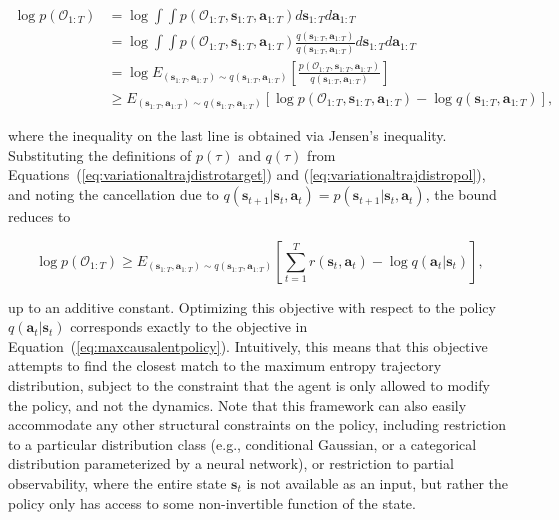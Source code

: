 \begin{align*}
\log p(\mathcal{O}_{1:T}) &= \log \int \int p(\mathcal{O}_{1:T}, \mathbf{s}_{1:T}, \mathbf{a}_{1:T}) d\mathbf{s}_{1:T} d\mathbf{a}_{1:T} \\
&= \log \int \int p(\mathcal{O}_{1:T}, \mathbf{s}_{1:T}, \mathbf{a}_{1:T}) \frac{q(\mathbf{s}_{1:T}, \mathbf{a}_{1:T})}{q(\mathbf{s}_{1:T}, \mathbf{a}_{1:T})} d\mathbf{s}_{1:T} d\mathbf{a}_{1:T} \\
&= \log E_{(\mathbf{s}_{1:T},\mathbf{a}_{1:T})\sim q(\mathbf{s}_{1:T}, \mathbf{a}_{1:T})} \left[ \frac{p(\mathcal{O}_{1:T}, \mathbf{s}_{1:T}, \mathbf{a}_{1:T})}{q(\mathbf{s}_{1:T}, \mathbf{a}_{1:T})} \right] \\
&\geq E_{(\mathbf{s}_{1:T},\mathbf{a}_{1:T})\sim q(\mathbf{s}_{1:T}, \mathbf{a}_{1:T})} \left[ \log p(\mathcal{O}_{1:T}, \mathbf{s}_{1:T}, \mathbf{a}_{1:T}) - \log q(\mathbf{s}_{1:T}, \mathbf{a}_{1:T}) \right],
\end{align*}

where the inequality on the last line is obtained via Jensen's inequality. Substituting the definitions of $p(\tau)$ and $q(\tau)$ from Equations~(\ref{eq:variationaltrajdistrotarget}) and (\ref{eq:variationaltrajdistropol}), and noting the cancellation due to $q(\mathbf{s}_{t+1}|\mathbf{s}_t,\mathbf{a}_t) = p(\mathbf{s}_{t+1}|\mathbf{s}_t,\mathbf{a}_t)$, the bound reduces to

\begin{equation}
\log p(\mathcal{O}_{1:T}) \geq E_{(\mathbf{s}_{1:T},\mathbf{a}_{1:T})\sim q(\mathbf{s}_{1:T}, \mathbf{a}_{1:T})} \left[ \sum_{t=1}^T r(\mathbf{s}_t,\mathbf{a}_t) - \log q(\mathbf{a}_t|\mathbf{s}_t) \right],
\end{equation}

up to an additive constant. Optimizing this objective with respect to the policy $q(\mathbf{a}_t|\mathbf{s}_t)$ corresponds exactly to the objective in Equation~(\ref{eq:maxcausalentpolicy}). Intuitively, this means that this objective attempts to find the closest match to the maximum entropy trajectory distribution, subject to the constraint that the agent is only allowed to modify the policy, and not the dynamics. Note that this framework can also easily accommodate any other structural constraints on the policy, including restriction to a particular distribution class (e.g., conditional Gaussian, or a categorical distribution parameterized by a neural network), or restriction to partial observability, where the entire state $\mathbf{s}_t$ is not available as an input, but rather the policy only has access to some non-invertible function of the state.

